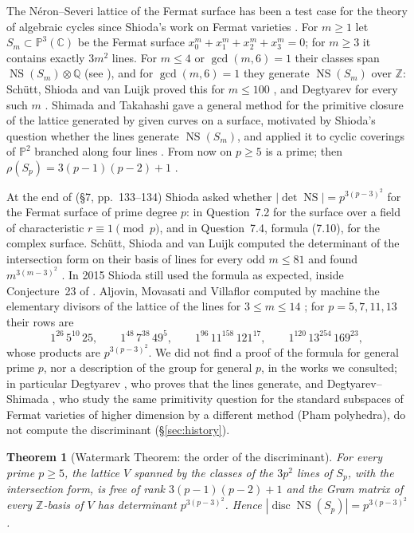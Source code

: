 \documentclass[11pt]{article}
\newtheorem{theorem}{Theorem}
\theoremstyle{definition}
\theoremstyle{remark}
\newcommand{\Z}{\mathbb{Z}}
\newcommand{\Q}{\mathbb{Q}}
\newcommand{\C}{\mathbb{C}}
\newcommand{\Pp}{\mathbb{P}}
\newcommand{\NS}{\operatorname{NS}}
\begin{document}
The N\'eron--Severi lattice of the Fermat surface has been a test case for the theory of algebraic cycles since Shioda's work on Fermat varieties \cite{Sh79,AS83,Sh87}. For $m\ge1$ let $S_m\subset\Pp^3(\C)$ be the Fermat surface $x_0^m+x_1^m+x_2^m+x_3^m=0$; for $m\ge3$ it contains exactly $3m^2$ lines. For $m\le 4$ or $\gcd(m,6)=1$ their classes span $\NS(S_m)\otimes\Q$ \cite{Sh82} (see \cite[\S3]{SSvL}), and for $\gcd(m,6)=1$ they generate $\NS(S_m)$ over $\Z$: Sch\"utt, Shioda and van Luijk proved this for $m\le 100$ \cite{SSvL}, and Degtyarev for every such $m$ \cite{Deg}. Shimada and Takahashi gave a general method for the primitive closure of the lattice generated by given curves on a surface, motivated by Shioda's question whether the lines generate $\NS(S_m)$, and applied it to cyclic coverings of $\Pp^2$ branched along four lines \cite[Theorems~1.2 and~1.4]{ST10}. From now on $p\ge5$ is a prime; then $\rho(S_p)=3(p-1)(p-2)+1$ \cite{Sh82,AS83}.

At the end of \cite{Sh87} (\S7, pp.~133--134) Shioda asked whether $|\det\NS| = p^{3(p-3)^2}$ for the Fermat surface of prime degree $p$: in Question~7.2 for the surface over a field of characteristic $r\equiv 1\pmod p$, and in Question~7.4, formula (7.10), for the complex surface. Sch\"utt, Shioda and van Luijk computed the determinant of the intersection form on their basis of lines for every odd $m\le 81$ and found $m^{3(m-3)^2}$ \cite[end of \S4]{SSvL}. In 2015 Shioda still used the formula as expected, inside Conjecture~23 of \cite{Sh15}. Aljovin, Movasati and Villaflor computed by machine the elementary divisors of the lattice of the lines for $3\le m\le 14$ \cite[Table~1]{AMV}; for $p=5,7,11,13$ their rows are
\[
1^{26}\,5^{10}\,25,\qquad 1^{48}\,7^{38}\,49^{5},\qquad 1^{96}\,11^{158}\,121^{17},\qquad 1^{120}\,13^{254}\,169^{23},
\]
whose products are $p^{3(p-3)^2}$. We did not find a proof of the formula for general prime $p$, nor a description of the group for general $p$, in the works we consulted; in particular Degtyarev \cite{Deg}, who proves that the lines generate, and Degtyarev--Shimada \cite{DS}, who study the same primitivity question for the standard subspaces of Fermat varieties of higher dimension by a different method (Pham polyhedra), do not compute the discriminant (\S\ref{sec:history}).

\begin{theorem}[Watermark Theorem: the order of the discriminant]\label{thm:A}
For every prime $p\ge5$, the lattice $V$ spanned by the classes of the $3p^2$ lines of $S_p$, with the intersection form, is free of rank $3(p-1)(p-2)+1$ and the Gram matrix of every $\Z$-basis of $V$ has determinant $p^{3(p-3)^2}$. Hence $|\operatorname{disc}\NS(S_p)|=p^{3(p-3)^2}$.
\end{theorem}
\end{document}
